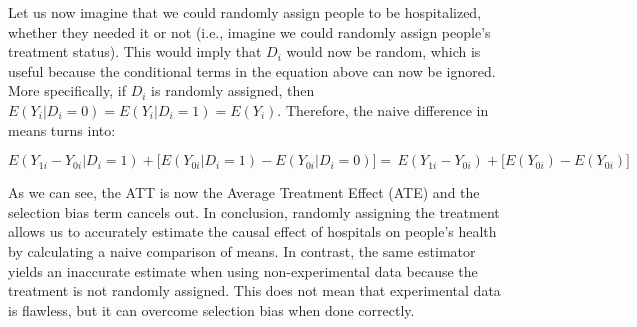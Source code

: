 \documentclass[12pt]{article}
\begin{document}
Let us now imagine that we could randomly assign people to be hospitalized,
whether they needed it or not (i.e., imagine we could randomly assign people's
treatment status). This would imply that $D_i$ would now be random, which is
useful because the conditional terms in the equation above can now be ignored.
More specifically, if $D_i$ is randomly assigned, then
$E(Y_i | D_i = 0) = E(Y_i | D_i = 1) = E(Y_i)$. Therefore, the naive difference
in means turns into:

\begin{equation*}
    E(Y_{1i} - Y_{0i} | D_i = 1)
        + \big[ E(Y_{0i} | D_i = 1) - E(Y_{0i} | D_i = 0) \big]
        = \, E(Y_{1i} - Y_{0i}) + \big[ E(Y_{0i}) - E(Y_{0i}) \big]
\end{equation*}

As we can see, the ATT is now the Average Treatment Effect (ATE) and the
selection bias term cancels out. In conclusion, randomly assigning the
treatment allows us to accurately estimate the causal effect of hospitals on
people's health by calculating a naive comparison of means. In contrast, the
same estimator yields an inaccurate estimate when using non-experimental data
because the treatment is not randomly assigned. This does not mean that
experimental data is flawless, but it can overcome selection bias when done
correctly.

\end{document}
